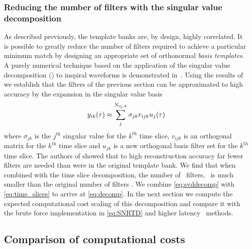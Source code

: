 \subsubsection{Reducing the number of filters with the singular value
decomposition}

As described previously, the template banks are, by design, highly correlated.
It is possible to greatly reduce the number of filters required to achieve a
particular minimum match by designing an appropriate set of orthonormal {\em
basis templates}.  A purely numerical technique based on the application of the
singular value decomposition (\SVD) to inspiral waveforms is demonstrated
in~\cite{Cannon:2010p10398}.  Using the results of ~\cite{Cannon:2010p10398} we
establish that the filters of the previous section can be approximated to high
accuracy by the expansion in the singular value basis
%
\begin{equation}
y_{ik}(\tau) \approx \sum_j^{N_{\mathrm{u_j},k}} \sigma_{jk} v_{ijk} u_{j}(\tau)
\label{eq:svddecomp}
\end{equation}
%
where $\sigma_{jk}$ is the $j^{\mathrm{th}}$ singular value for the
$k^{\mathrm{th}}$ time slice, $v_{ijk}$ is an orthogonal matrix for the
$k^{\mathrm{th}}$ time slice  and $u_{jk}$ is a new orthogonal basis filter set
for the $k^{\mathrm{th}}$ time slice.  The authors of \cite{Cannon:2010p10398}
showed that to high reconstruction accuracy far fewer filters are needed than
were in the original template bank. We find that when combined with the time
slice decomposition, the number of \SVD\ filters, \numsvdtmps\ is much smaller
than the original number of filters \numtmps.  We combine \eqref{eq:svddecomp}
with \eqref{eq:time_slices} to arrive at \eqref{eq:decomp}.  In the next
section we compute the expected computational cost scaling of this
decomposition and compare it with the brute force implementation in
\eqref{eq:SNRTD} and higher latency \fft\ methods.

\subsection{Comparison of computational costs}

